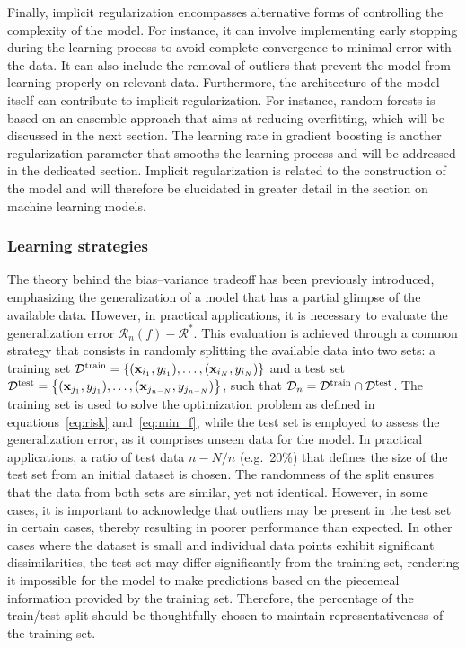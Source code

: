 \documentclass[main]{subfiles}
\begin{document}
Finally, implicit regularization encompasses alternative forms of controlling the complexity of the model. For instance, it can involve implementing early stopping during the learning process to avoid complete convergence to minimal error with the data. It can also include the removal of outliers that prevent the model from learning properly on relevant data. Furthermore, the architecture of the model itself can contribute to implicit regularization. For instance, random forests is based on an ensemble approach that aims at reducing overfitting, which will be discussed in the next section. The learning rate in gradient boosting is another regularization parameter that smooths the learning process and will be addressed in the dedicated section. Implicit regularization is related to the construction of the model and will therefore be elucidated in greater detail in the section on machine learning models.

\subsubsection{Learning strategies}

The theory behind the bias--variance tradeoff has been previously introduced, emphasizing the generalization of a model that has a partial glimpse of the available data. However, in practical applications, it is necessary to evaluate the generalization error $\mathcal{R}_n(f)-\mathcal{R}^*$. This evaluation is achieved through a common strategy that consists in randomly splitting the available data into two sets: a training set $\mathcal{D}^{\text{train}}=\left\{{(\mathbf{x}_{i_1},y_{i_1}),\ldots,(\mathbf{x}_{i_N},y_{i_N})}\right\}$ and a test set $\mathcal{D}^{\text{test}}=\left\{(\mathbf{x}_{j_1},y_{j_1}),\ldots,(\mathbf{x}_{j_{n-N}},y_{j_{n-N}})\right\}$, such that $\mathcal{D}_n = \mathcal{D}^{\text{train}} \cap \mathcal{D}^{\text{test}}$. The training set is used to solve the optimization problem as defined in equations~\ref{eq:risk} and~\ref{eq:min_f}, while the test set is employed to assess the generalization error, as it comprises unseen data for the model. In practical applications, a ratio of test data $n-N/n$ (e.g.\ {20\%}) that defines the size of the test set from an initial dataset is chosen. The randomness of the split ensures that the data from both sets are similar, yet not identical. However, in some cases, it is important to acknowledge that outliers may be present in the test set in certain cases, thereby resulting in poorer performance than expected. In other cases where the dataset is small and individual data points exhibit significant dissimilarities, the test set may differ significantly from the training set, rendering it impossible for the model to make predictions based on the piecemeal information provided by the training set. Therefore, the percentage of the train/test split should be thoughtfully chosen to maintain representativeness of the training set.
\end{document}
